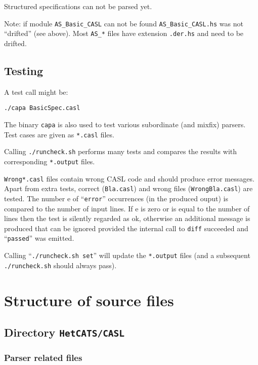 \documentclass{article}
\begin{document}
Structured specifications can not be parsed yet.

Note: if module \texttt{AS\_Basic\_CASL} can not be found
\texttt{AS\_Basic\_CASL.hs} was not ``drifted'' (see above). Most
\texttt{AS\_*} files have extension \texttt{.der.hs} and need to
be drifted.

\subsection{Testing}

A test call might be: 

\texttt{./capa BasicSpec.casl}

The binary \texttt{capa} is also used to test various subordinate (and
mixfix) parsers. Test cases are given as \texttt{*.casl} files.

Calling \texttt{./runcheck.sh} performs many tests and compares the
results with corresponding \texttt{*.output} files.

\texttt{Wrong*.casl} files contain wrong CASL code and should produce
error messages. Apart from extra tests, correct (\texttt{Bla.casl})
and wrong files (\texttt{WrongBla.casl}) are tested. The number e of
``\texttt{error}'' occurrences (in the produced ouput) is compared to the
number of input lines. If e is zero or is equal to the number of lines
then the test is silently regarded as ok, otherwise an additional message
is produced that can be ignored provided the internal call to
\texttt{diff} succeeded and ``\texttt{passed}'' was emitted.

Calling ``\texttt{./runcheck.sh set}'' will update the \texttt{*.output} files (and a subsequent \texttt{./runcheck.sh} should always pass).

\section{Structure of source files}

\subsection{Directory \texttt{HetCATS/CASL}}

\subsubsection*{Parser related files}
\end{document}
